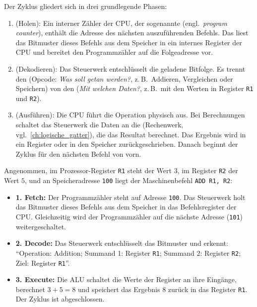 Der Zyklus gliedert sich in drei grundlegende Phasen:
\begin{enumerate}
    \item {} (Holen): Ein interner Zähler der \gls{CPU}, der sogenannte  (engl.\ \emph{program counter}), enthält die Adresse des nächsten auszuführenden Befehls. Das  liest das Bitmuster dieses Befehls aus dem Speicher in ein internes Register der \gls{CPU} und bereitet den Programmzähler auf die Folgeadresse vor.
    \item {} (Dekodieren): Das Steuerwerk entschlüsselt die geladene Bitfolge. Es trennt den  (Opcode: \emph{Was soll getan werden?}, z.\,B.\ Addieren, Vergleichen oder Speichern) von den  (\emph{Mit welchen Daten?}, z.\,B.\ mit den Werten in Register \texttt{R1} und \texttt{R2}).
    \item {} (Ausführen): Die \gls{CPU} führt die Operation physisch aus. Bei Berechnungen schaltet das Steuerwerk die Daten an die  (Rechenwerk, vgl.\ \cref{ch:logische_gatter}), die das Resultat berechnet. Das Ergebnis wird in ein Register oder in den Speicher zurückgeschrieben. Danach beginnt der Zyklus für den nächsten Befehl von vorn.
\end{enumerate}

\begin{myexample}
    Angenommen, im Prozessor-Register \texttt{R1} steht der Wert $3$, im Register \texttt{R2} der Wert $5$, und an Speicheradresse \texttt{100} liegt der Maschinenbefehl \texttt{ADD R1, R2}:
    \begin{itemize}
        \item \textbf{1. Fetch:} Der Programmzähler steht auf Adresse \texttt{100}. Das Steuerwerk holt das Bitmuster dieses Befehls aus dem Speicher in das Befehlsregister der \gls{CPU}. Gleichzeitig wird der Programmzähler auf die nächste Adresse (\texttt{101}) weitergeschaltet.
        \item \textbf{2. Decode:} Das Steuerwerk entschlüsselt das Bitmuster und erkennt: \enquote{Operation: Addition; Summand 1: Register \texttt{R1}; Summand 2: Register \texttt{R2}; Ziel: Register \texttt{R1}}.
        \item \textbf{3. Execute:} Die \gls{ALU} schaltet die Werte der Register an ihre Eingänge, berechnet $3 + 5 = 8$ und speichert das Ergebnis $8$ zurück in das Register \texttt{R1}. Der Zyklus ist abgeschlossen.
    \end{itemize}
\end{myexample}

